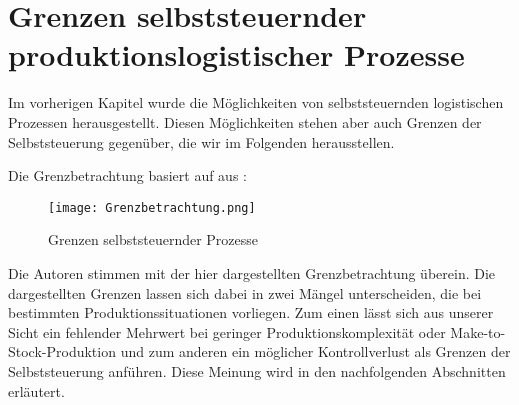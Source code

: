 \section{Grenzen selbststeuernder produktionslogistischer Prozesse}
\label{sec:Grenzen}

Im vorherigen Kapitel wurde die Möglichkeiten von selbststeuernden logistischen Prozessen herausgestellt. Diesen 
Möglichkeiten stehen aber auch Grenzen der Selbststeuerung gegenüber, die wir im Folgenden herausstellen.

Die Grenzbetrachtung basiert auf  aus \citet{evolution2007}:

\begin{figure}[htb] 
\centering
\texttt{[image: Grenzbetrachtung.png]}
\caption[Grenzbetrachtung]{Grenzen selbststeuernder Prozesse\protect\footnotemark}
\label{fig:Grenzbetrachtung}
\end{figure}

Die Autoren stimmen mit der hier dargestellten Grenzbetrachtung überein. Die dargestellten Grenzen lassen sich dabei in 
zwei Mängel unterscheiden, die bei bestimmten Produktionssituationen vorliegen. Zum einen lässt sich aus unserer Sicht ein 
fehlender Mehrwert bei geringer  Produktionskomplexität oder Make-to-Stock-Produktion und zum anderen ein möglicher 
Kontrollverlust als Grenzen der Selbststeuerung anführen. Diese Meinung wird in den nachfolgenden Abschnitten erläutert.



